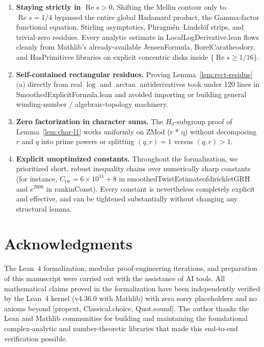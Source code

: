 \documentclass[11pt,reqno]{amsart}
\numberwithin{equation}{section}
\theoremstyle{definition}
\newcommand{\1}{\mathbf{1}}
\renewcommand{\Re}{\operatorname{Re}}
\newcommand{\lean}[1]{{\footnotesize\ttfamily\renewcommand{\_}{\textunderscore\allowbreak}#1}}
\begin{document}
\begin{enumerate}[label=(\roman*),leftmargin=2em]
  \item \textbf{Staying strictly in $\Re s > 0$.} Shifting the Mellin contour only to $\Re s = 1/4$ bypassed the entire global Hadamard product, the Gamma-factor functional equation, Stirling asymptotics, Phragm\'en--Lindel\"of strips, and trivial-zero residues. Every analytic estimate in \lean{LocalLogDerivative.lean} flows cleanly from Mathlib's already-available \lean{JensenFormula}, \lean{BorelCaratheodory}, and \lean{HasPrimitives} libraries on explicit concentric disks inside $\{\Re s \ge 1/16\}$.
  \item \textbf{Self-contained rectangular residues.} Proving Lemma~\ref{lem:rect-residue}(a) directly from real $\log$ and $\arctan$ antiderivatives took under 120 lines in \lean{SmoothedExplicitFormula.lean} and avoided importing or building general winding-number / algebraic-topology machinery.
  \item \textbf{Zero factorization in character sums.} The $H_0$-subgroup proof of Lemma~\ref{lem:char-l1} works uniformly on \lean{ZMod (r * q)} without decomposing $r$ and $q$ into prime powers or splitting $(q, r) = 1$ versus $(q, r) > 1$.
  \item \textbf{Explicit unoptimized constants.} Throughout the formalization, we prioritized short, robust inequality chains over numerically sharp constants (for instance, $C_{\mathrm{tw}} = 6 \times 10^{11} + 8$ in \lean{smoothedTwistEstimate\_of\_dirichletGRH} and $e^{2008}$ in \lean{rankinConst}). Every constant is nevertheless completely explicit and effective, and can be tightened substantially without changing any structural lemma.
\end{enumerate}

\section*{Acknowledgments}
The Lean~4 formalization, modular proof-engineering iterations, and preparation of this manuscript were carried out with the assistance of AI tools. All mathematical claims proved in the formalization have been independently verified by the Lean~4 kernel (\lean{v4.36.0} with Mathlib) with zero \lean{sorry} placeholders and no axioms beyond \lean{[propext, Classical.choice, Quot.sound]}. The author thanks the Lean and Mathlib communities for building and maintaining the foundational complex-analytic and number-theoretic libraries that made this end-to-end verification possible.



\end{document}
